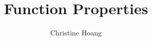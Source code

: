 \documentclass{article}
\title{Function Properties}
\author{Christine Hoang}
\begin{document}
\maketitle

\section{}
\end{document}
